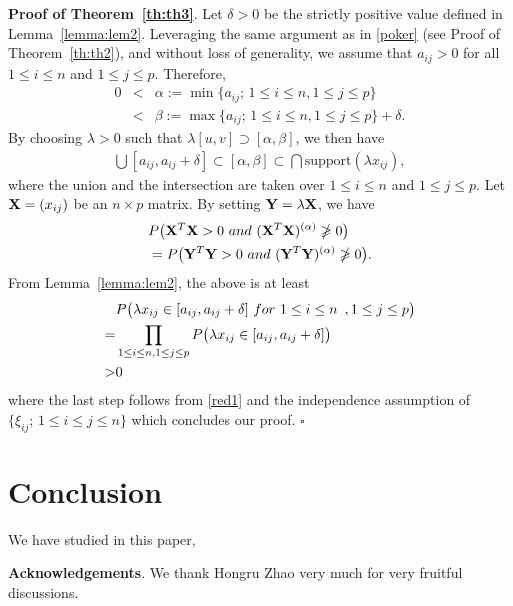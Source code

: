 \documentclass[conference,letterpaper]{IEEEtran}
\numberwithin{equation}{section}
\newcommand{\lbl}{\label}
\newcommand{\bd}{\bold}
\newcommand{\beaa}{\begin{eqnarray*}}
\newcommand{\eeaa}{\end{eqnarray*}}
\newcommand{\bea}{\begin{eqnarray}}
\newcommand{\eea}{\end{eqnarray}}
\begin{document}
\noindent\textbf{Proof of Theorem~\ref{th:th3}}. Let $\delta >0$ be the strictly positive value defined in Lemma~\ref{lemma:lem2}. 
Leveraging the same argument as in \eqref{poker} (see Proof of Theorem~\ref{th:th2}), and without loss of generality, we assume that $a_{ij}>0$ for all $1\leq i\leq n$ and $1\leq j \leq p$. 
Therefore,
\beaa
0&<&\alpha:=\min\{a_{ij};\, 1\leq i \leq n, 1\leq j \leq p\}\\
&<& \beta:=\max\{a_{ij};\, 1\leq i\leq n, 1\leq j \leq p\}+\delta.
\eeaa
By choosing $\lambda>0$ such that $\lambda [u, v]\supset [\alpha , \beta]$, we then have
\bea\lbl{red1}
\bigcup [a_{ij}, a_{ij}+\delta] \subset [\alpha, \beta]\subset \bigcap   \mbox{support}(\lambda x_{ij}),
\eea
where the union and the intersection are taken over $1\leq i \leq n$ and $1\leq j \leq p.$ 
Let $\bd{X}=(x_{ij})$ be an $n\times p $ matrix.
By setting $\bd{Y}=\lambda\bd{X}$, we have
\beaa
& P\big(\bd{X}^T\bd{X}>0\ \mbox{and}\ (\bd{X}^T\bd{X})^{(\alpha)}\ngeqslant 0\big)\\
& =  P\big(\bd{Y}^T\bd{Y}>0\ \mbox{and}\ (\bd{Y}^T\bd{Y})^{(\alpha)}\ngeqslant 0\big).
\eeaa
From Lemma~\ref{lemma:lem2}, the above is at least
\begin{align}\notag
& P\big(\lambda x_{ij}\in [a_{ij}, a_{ij}+\delta]\ \mbox{for}\ 1\leq i\leq n\ \,, 1\leq j \leq p\big)\\ \notag
=& \prod_{1\leq i\leq n, 1\leq j \leq p}P\big(\lambda x_{ij}\in [a_{ij}, a_{ij}+\delta]\big)\\\notag
>& 0\notag
\end{align}
where the last step follows from \eqref{red1} and the independence assumption of $\{\xi_{ij};\, 1\leq i \leq j \leq n\}$ which concludes our proof. \hfill$\square$



\section{Conclusion}\lbl{sec:conclusion}

We have studied in this paper, 


\noindent\textbf{Acknowledgements}. We thank Hongru Zhao very much for very fruitful   discussions.



\end{document}
